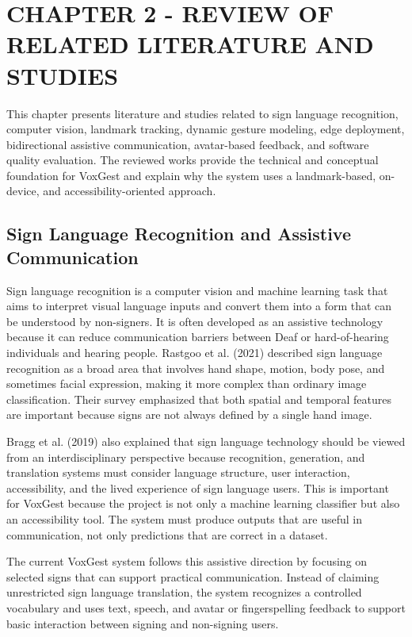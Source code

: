 
\chapter{\uppercase {\textbf{CHAPTER 2 - REVIEW OF RELATED LITERATURE AND STUDIES}}}

This chapter presents literature and studies related to sign language recognition, computer vision, landmark tracking, dynamic gesture modeling, edge deployment, bidirectional assistive communication, avatar-based feedback, and software quality evaluation. The reviewed works provide the technical and conceptual foundation for VoxGest and explain why the system uses a landmark-based, on-device, and accessibility-oriented approach.

\section{Sign Language Recognition and Assistive Communication}

Sign language recognition is a computer vision and machine learning task that aims to interpret visual language inputs and convert them into a form that can be understood by non-signers. It is often developed as an assistive technology because it can reduce communication barriers between Deaf or hard-of-hearing individuals and hearing people. Rastgoo et al. (2021) described sign language recognition as a broad area that involves hand shape, motion, body pose, and sometimes facial expression, making it more complex than ordinary image classification. Their survey emphasized that both spatial and temporal features are important because signs are not always defined by a single hand image.

Bragg et al. (2019) also explained that sign language technology should be viewed from an interdisciplinary perspective because recognition, generation, and translation systems must consider language structure, user interaction, accessibility, and the lived experience of sign language users. This is important for VoxGest because the project is not only a machine learning classifier but also an accessibility tool. The system must produce outputs that are useful in communication, not only predictions that are correct in a dataset.

The current VoxGest system follows this assistive direction by focusing on selected signs that can support practical communication. Instead of claiming unrestricted sign language translation, the system recognizes a controlled vocabulary and uses text, speech, and avatar or fingerspelling feedback to support basic interaction between signing and non-signing users.

